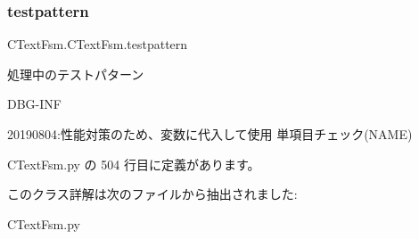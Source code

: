 \subsubsection{\texorpdfstring{testpattern}{testpattern}}
{\footnotesize\ttfamily C\+Text\+Fsm.\+C\+Text\+Fsm.\+testpattern}



処理中のテストパターン 

D\+B\+G-\/\+I\+NF

20190804\+:性能対策のため、変数に代入して使用 単項目チェック(\+N\+A\+M\+E) 

 C\+Text\+Fsm.\+py の 504 行目に定義があります。



このクラス詳解は次のファイルから抽出されました\+:\begin{DoxyCompactItemize}
\item 
C\+Text\+Fsm.\+py\end{DoxyCompactItemize}
